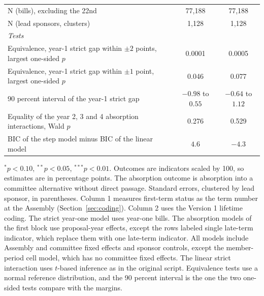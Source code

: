 \documentclass[11pt]{article}
\begin{document}
\begin{table}[H]
\begin{tabular}{p{}cc}
N (bills), excluding the 22nd & 77,188 & 77,188 \\
N (lead sponsors, clusters) & 1,128 & 1,128 \\
\midrule
\multicolumn{3}{l}{\textit{Tests}} \\
Equivalence, year-1 strict gap within $\pm 2$ points, largest one-sided $p$ & 0.0001 & 0.0005 \\
Equivalence, year-1 strict gap within $\pm 1$ point, largest one-sided $p$ & 0.046 & 0.077 \\
90 percent interval of the year-1 strict gap & $-0.98$ to $0.55$ & $-0.64$ to $1.12$ \\
Equality of the year 2, 3 and 4 absorption interactions, Wald $p$ & 0.276 & 0.529 \\
BIC of the step model minus BIC of the linear model & $4.6$ & $-4.3$ \\
\bottomrule
\end{tabular}

\smallskip
\begin{minipage}{0.95\textwidth}
\footnotesize $^{*}p<0.10$, $^{**}p<0.05$, $^{***}p<0.01$. Outcomes are indicators scaled by 100, so estimates are in percentage points. The absorption outcome is absorption into a committee alternative without direct passage. Standard errors, clustered by lead sponsor, in parentheses. Column 1 measures first-term status as the term number at the Assembly (Section~\ref{sec:coding}). Column 2 uses the Version 1 lifetime coding. The strict year-one model uses year-one bills. The absorption models of the first block use proposal-year effects, except the rows labeled single late-term indicator, which replace them with one late-term indicator. All models include Assembly and committee fixed effects and sponsor controls, except the member-period cell model, which has no committee fixed effects. The linear strict interaction uses $t$-based inference as in the original script. Equivalence tests use a normal reference distribution, and the 90 percent interval is the one the two one-sided tests compare with the margins.
\end{minipage}
\end{table}
\end{document}
